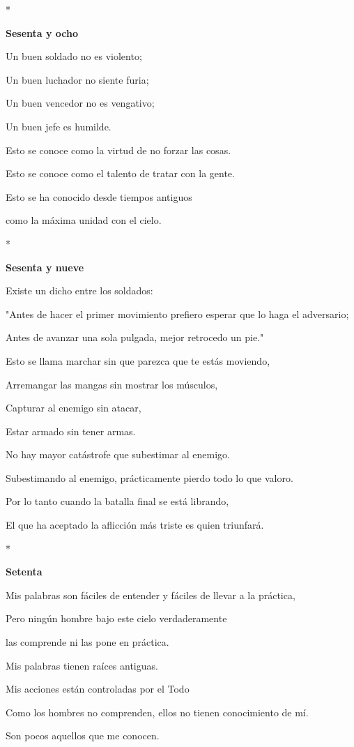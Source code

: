 *

\textbf{Sesenta y ocho}

Un buen soldado no es violento;

Un buen luchador no siente furia;

Un buen vencedor no es vengativo;

Un buen jefe es humilde.

Esto se conoce como la virtud de no forzar las cosas.

Esto se conoce como el talento de tratar con la gente.

Esto se ha conocido desde tiempos antiguos

como la máxima unidad con el cielo.

*

\textbf{Sesenta y nueve}

Existe un dicho entre los soldados:

"Antes de hacer el primer movimiento prefiero esperar que lo haga el
adversario;

Antes de avanzar una sola pulgada, mejor retrocedo un pie."

Esto se llama marchar sin que parezca que te estás moviendo,

Arremangar las mangas sin mostrar los músculos,

Capturar al enemigo sin atacar,

Estar armado sin tener armas.

No hay mayor catástrofe que subestimar al enemigo.

Subestimando al enemigo, prácticamente pierdo todo lo que valoro.

Por lo tanto cuando la batalla final se está librando,

El que ha aceptado la aflicción más triste es quien triunfará.

*

\textbf{Setenta}

Mis palabras son fáciles de entender y fáciles de llevar a la práctica,

Pero ningún hombre bajo este cielo verdaderamente

las comprende ni las pone en práctica.

Mis palabras tienen raíces antiguas.

Mis acciones están controladas por el Todo

Como los hombres no comprenden, ellos no tienen conocimiento de mí.

Son pocos aquellos que me conocen.

